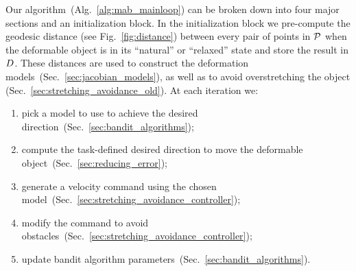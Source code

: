 Our algorithm~(Alg.~\ref{alg:mab_mainloop}) can be broken down into four major sections and an initialization block. In the initialization block we pre-compute the geodesic distance (see Fig.~\ref{fig:distance}) between every pair of points in $\mathcal{P}$ when the deformable object is in its ``natural'' or ``relaxed'' state and store the result in $D$. These distances are used to construct the deformation models~(Sec.~\ref{sec:jacobian_models}), as well as to avoid overstretching the object (Sec.~\ref{sec:stretching_avoidance_old}).
At each iteration we: 
\begin{enumerate}
    \item pick a model to use to achieve the desired direction~(Sec.~\ref{sec:bandit_algorithms}); 
    \item compute the task-defined desired direction to move the deformable object~(Sec.~\ref{sec:reducing_error}); 
    \item generate a velocity command using the chosen model~(Sec.~\ref{sec:stretching_avoidance_controller}); 
    \item modify the command to avoid obstacles~(Sec.~\ref{sec:stretching_avoidance_controller});
    \item update bandit algorithm parameters~(Sec.~\ref{sec:bandit_algorithms}).
\end{enumerate}


